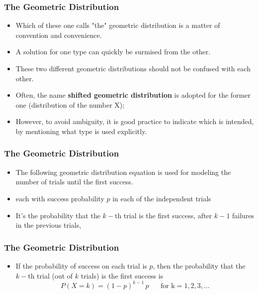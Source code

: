 \begin{frame}
\frametitle{The Geometric Distribution}
\Large
\begin{itemize}
\item Which of these one calls "the" geometric distribution is a matter of convention and convenience. 
\item A solution for one type can quickly be surmised from the other.
\item These two different geometric distributions should not be confused with each other. 
\item Often, the name \textbf{shifted geometric distribution} is adopted for the former one (distribution of the number X); 
\item However, to avoid ambiguity, it is good practice to indicate which is intended, by mentioning what type is used explicitly.
\end{itemize}
\end{frame}
\begin{frame}
\frametitle{The Geometric Distribution}
\Large
\begin{itemize}
\item The following geometric distribution equation is used for modeling the number of trials until the first success. 

\item each with success probability $p$ in each of the independent trials 
 
\item It’s the probability that the $k-$th trial is the first success, after $k-1$ failures in the previous trials, 
\end{itemize}
\end{frame}
\begin{frame}
\frametitle{The Geometric Distribution}
\Large
\begin{itemize}
\item If the probability of success on each trial is $p$, then the probability that the $k-$th trial (out of $k$ trials) is the first success is
\[P(X = k) = (1-p)^{k-1}\,p\, \phantom{spa} \mbox{for k} = 1, 2, 3, \ldots \]



\end{itemize}
\end{frame}
